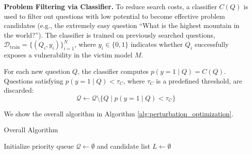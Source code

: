 {\textbf{Problem Filtering via Classifier.} To reduce search costs, a classifier \( C(Q) \) is used to filter out questions with low potential to become effective problem candidates (e.g., the extremely easy question ``What is the highest mountain in the world?''). The classifier is trained on previously searched questions, \( \mathcal{D}_\text{train} = \{(Q_i, y_i)\}_{i=1}^{N} \), where \( y_i \in \{0, 1\} \) indicates whether \( Q_i \) successfully exposes a vulnerability in the victim model \( M \).

For each new question \( Q \), the classifier computes \( p(y=1 \mid Q) = C(Q) \). Questions satisfying \( p(y=1 \mid Q) < \tau_C \), where \( \tau_C \) is a predefined threshold, are discarded:
\begin{equation}
\mathcal{Q} \gets \mathcal{Q} \setminus \{Q \mid p(y=1 \mid Q) < \tau_C\}
\end{equation}


We show the overall algorithm in Algorithm \ref{alg:perturbation_optimization}.

\begin{algorithm}[h!]
\small
\caption{Overall Algorithm}
\label{alg:perturbation_optimization}

Initialize priority queue \( \mathcal{Q} \gets \emptyset \) and candidate list \( L \gets \emptyset \)\;


\end{algorithm}}
